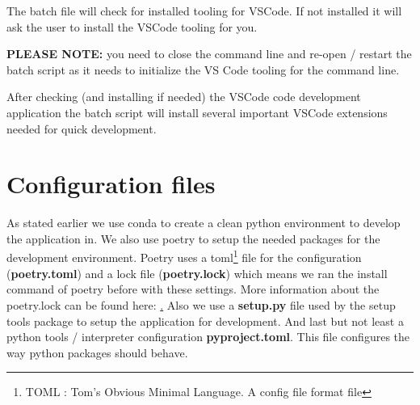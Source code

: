 The batch file will check for installed tooling for VSCode. If not installed it will ask the user to install the VSCode tooling for you. 

\begin{Remark}
	\item \textbf{PLEASE NOTE:} you need to close the command line and re-open / restart the batch script as it needs to initialize the VS Code tooling for the command line.
\end{Remark}

After checking (and installing if needed) the VSCode code development application the batch script will install several important VSCode extensions needed for quick development.


\section{Configuration files}
As stated earlier we use conda to create a clean python environment to develop the \dfastmi application in. We also use poetry to setup the needed packages for the development environment. Poetry uses a toml\footnote{TOML : Tom's Obvious Minimal Language. A config file format file} file for the configuration (\textbf{poetry.toml}) and a lock file (\textbf{poetry.lock}) which means we ran the install command of poetry before with these settings. More information about the poetry.lock can be found here: \href{https://python-poetry.org/docs/basic-usage/#installing-without-poetrylock}. Also we use a \textbf{setup.py} file used by the setup tools package to setup the application for development. And last but not least a python tools / interpreter configuration \textbf{pyproject.toml}. This file configures the way python packages should behave.

